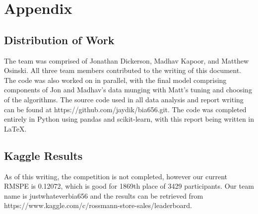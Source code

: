 \documentclass[DIV=calc, paper=a4, fontsize=11pt]{scrartcl}	 %
\begin{document}
\newpage

\section*{Appendix}

\subsection*{Distribution of Work}
The team was comprised of Jonathan Dickerson, Madhav Kapoor, and Matthew Osinski. All three team members contributed to the writing of this document. The code was also worked on in parallel, with the final model comprising components of Jon and Madhav's data munging with Matt's tuning and choosing of the algorithms. The source code used in all data analysis and report writing can be found at https://github.com/jaydik/bia656.git. The code was completed entirely in Python using pandas and scikit-learn, with this report being written in \LaTeX. 

\subsection*{Kaggle Results}
As of this writing, the competition is not completed, however our current RMSPE is 0.12072, which is good for 1869th place of 3429 participants. Our team name is justwhateverbia656 and the results can be retrieved from https://www.kaggle.com/c/rossmann-store-sales/leaderboard. 
\end{document}
